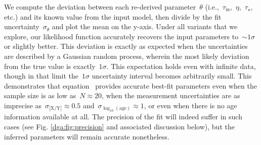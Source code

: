 We compute the deviation between each re-derived parameter~$\theta$
(i.e.,~$\tau_\text{in}$,~$\eta$,~$\tau_\star$, etc.) and its known value from
the input model, then divide by the fit uncertainty~$\sigma_\theta$ and plot
the mean on the y-axis.
Under all variants that we explore, our likelihood function accurately recovers
the input parameters to~$\sim1\sigma$ or slightly better.
This deviation is exactly as expected when the uncertainties are described by a
Gaussian random process, wherein the most likely deviation from the true value
is exactly~$1\sigma$.
This expectation holds even with infinite data, though in that limit
the~$1\sigma$ uncertainty interval becomes arbitrarily small.
This demonstrates that equation~ provides accurate best-fit
parameters even when the sample size is as low as~$N \approx 20$, when the
measurement uncertainties are as imprecise as~$\sigma_\text{[X/Y]} \approx 0.5$
and~$\sigma_{\log_{10}(\text{age})} \approx 1$, or even when there is no age
information available at all.
The precision of the fit will indeed suffer in such cases (see Fig.
\ref{dga:fig:precision} and associated discussion below), but the inferred
parameters will remain accurate nonetheless.

